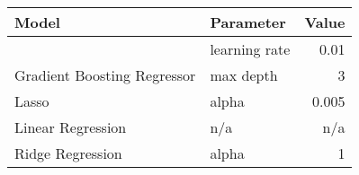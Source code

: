 
\begin{tabular}[t]{llr}
\toprule
\multicolumn{1}{l}{Model} & \multicolumn{1}{l}{Parameter} & \multicolumn{1}{l}{Value}\\
\midrule
 & learning rate & 0.01\\

\multirow[t]{-2}{*}{\raggedright\arraybackslash Gradient Boosting Regressor} & max depth & 3\\
\cmidrule(lr){1-3}

Lasso & alpha & 0.005\\
\cmidrule(lr){1-3}

Linear Regression & n/a & n/a\\
\cmidrule(lr){1-3}

Ridge Regression & alpha & 1\\
\bottomrule
\end{tabular}
